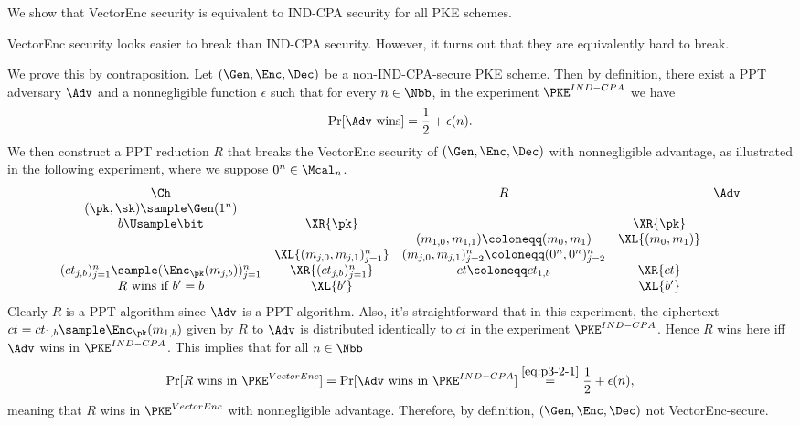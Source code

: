 \begin{answer}[ii]
    We show that VectorEnc security is equivalent to IND-CPA security for all PKE schemes.
    \begin{note}
        VectorEnc security looks easier to break than IND-CPA security. However, it turns out that they are equivalently hard to break.
    \end{note}
    
    We prove this by contraposition. Let $(\Gen, \Enc, \Dec)$ be a non-IND-CPA-secure PKE scheme. Then by definition, there exist a PPT adversary $\Adv$ and a nonnegligible function $\epsilon$ such that for every $n\in\Nbb$, in the experiment $\PKE^{IND-CPA}$ we have
    \begin{equation}\label{eq:p3-2-1}
        \Pr[\Adv \textrm{ wins}] =\frac{1}{2}+\epsilon(n).
    \end{equation}
    We then construct a PPT reduction $R$ that breaks the VectorEnc security of $(\Gen, \Enc, \Dec)$ with nonnegligible advantage, as illustrated in the following experiment, where we suppose $0^n\in \Mcal_n$.
    {
        \[
            \begin{array}{@{} c c c c c@{}}
            \Ch & & R & & \Adv \\
            (\pk, \sk)\sample \Gen(1^n) & &  & & \\
            b\Usample\bit & \XR{\pk} & & \XR{\pk} &\\
            &  & (m_{1,0}, m_{1,1})\coloneqq (m_0, m_1) & \XL{(m_0, m_1)} & \\
            & \XL{(m_{j,0}, m_{j,1})_{j=1}^n} & (m_{j,0}, m_{j,1})_{j=2}^n \coloneqq (0^n,0^n)_{j=2}^n &&\\
            (ct_{j,b})_{j=1}^n\sample (\Enc_{\pk}(m_{j,b}))_{j=1}^n  & \XR{(ct_{j,b})_{j=1}^n}& ct\coloneqq ct_{1,b} & \XR{ct} &\\
            \text{$R$ wins if $b' = b$} & \XL{b'} & & \XL{b'} & \\
            \end{array}
        \]
        \label{fig:p3-game4}
    }
    Clearly $R$ is a PPT algorithm since $\Adv$ is a PPT algorithm. Also, it's straightforward that in this experiment, the ciphertext $ct=ct_{1,b}\sample \Enc_{\pk}(m_{1,b})$ given by $R$ to $\Adv$ is distributed identically to  $ct$ in the experiment $\PKE^{IND-CPA}$. Hence $R$ wins here iff $\Adv$ wins in $\PKE^{IND-CPA}$. This implies that for all $n\in\Nbb$
    \[
        \Pr[R \textrm{ wins in } \PKE^{VectorEnc}] =  \Pr[\Adv \textrm{ wins in } \PKE^{IND-CPA}] 
        \stackrel{\eqref{eq:p3-2-1}}= \frac{1}{2}+\epsilon(n),
    \]
    meaning that $R$ wins in $\PKE^{VectorEnc}$ with nonnegligible advantage. Therefore, by definition, $(\Gen, \Enc, \Dec)$ not VectorEnc-secure. 



\end{answer}
